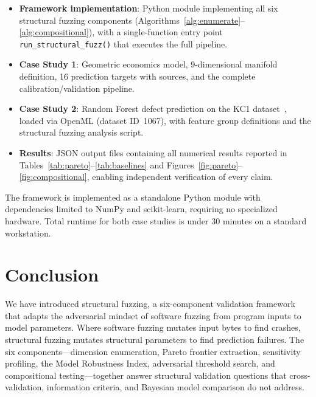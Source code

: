 \documentclass[manuscript,review,anonymous]{acmart}
\begin{document}
\begin{itemize}
    \item \textbf{Framework implementation}: Python module implementing all six structural fuzzing components (Algorithms~\ref{alg:enumerate}--\ref{alg:compositional}), with a single-function entry point \texttt{run\_structural\_fuzz()} that executes the full pipeline.
    \item \textbf{Case Study 1}: Geometric economics model, 9-dimensional manifold definition, 16 prediction targets with sources, and the complete calibration/validation pipeline.
    \item \textbf{Case Study 2}: Random Forest defect prediction on the KC1 dataset~\cite{menzies2007}, loaded via OpenML (dataset ID~1067), with feature group definitions and the structural fuzzing analysis script.
    \item \textbf{Results}: JSON output files containing all numerical results reported in Tables~\ref{tab:pareto}--\ref{tab:baselines} and Figures~\ref{fig:pareto}--\ref{fig:compositional}, enabling independent verification of every claim.
\end{itemize}

The framework is implemented as a standalone Python module with dependencies limited to NumPy and scikit-learn, requiring no specialized hardware.
Total runtime for both case studies is under 30 minutes on a standard workstation.

\section{Conclusion}
\label{sec:conclusion}

We have introduced structural fuzzing, a six-component validation framework that adapts the adversarial mindset of software fuzzing from program inputs to model parameters.
Where software fuzzing mutates input bytes to find crashes, structural fuzzing mutates structural parameters to find prediction failures.
The six components---dimension enumeration, Pareto frontier extraction, sensitivity profiling, the Model Robustness Index, adversarial threshold search, and compositional testing---together answer structural validation questions that cross-validation, information criteria, and Bayesian model comparison do not address.
\end{document}
